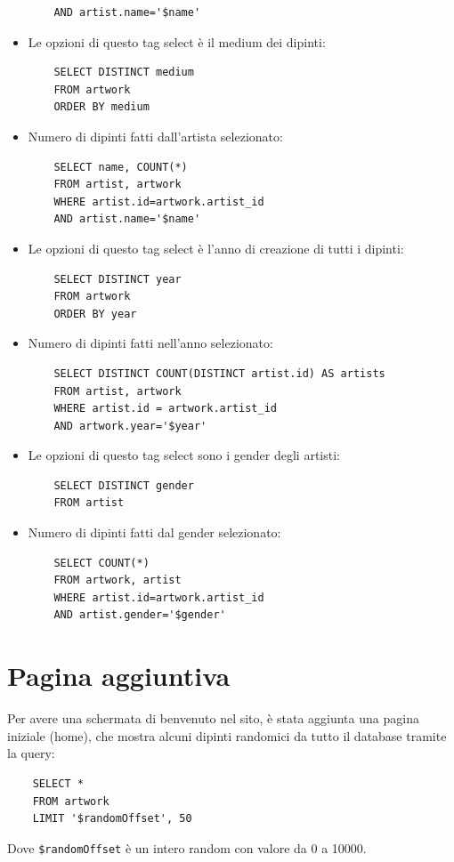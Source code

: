\documentclass{ol-softwaremanual}
\begin{document}
\begin{itemize}
\begin{verbatim}
    AND artist.name='$name'
    \end{verbatim}
    \item Le opzioni di questo tag select è il medium dei dipinti:
    \begin{verbatim}
    SELECT DISTINCT medium 
    FROM artwork
    ORDER BY medium
    \end{verbatim}
    \item Numero di dipinti fatti dall'artista selezionato:
    \begin{verbatim}
    SELECT name, COUNT(*)
    FROM artist, artwork 
    WHERE artist.id=artwork.artist_id
    AND artist.name='$name'
    \end{verbatim}
    \item Le opzioni di questo tag select è l'anno di creazione di tutti i dipinti:
    \begin{verbatim}
    SELECT DISTINCT year
    FROM artwork
    ORDER BY year
    \end{verbatim}
    \item Numero di dipinti fatti nell'anno selezionato:
    \begin{verbatim}
    SELECT DISTINCT COUNT(DISTINCT artist.id) AS artists 
    FROM artist, artwork 
    WHERE artist.id = artwork.artist_id 
    AND artwork.year='$year'
    \end{verbatim}
    \item Le opzioni di questo tag select sono i gender degli artisti:
    \begin{verbatim}
    SELECT DISTINCT gender
    FROM artist
    \end{verbatim}
    \item Numero di dipinti fatti dal gender selezionato:
    \begin{verbatim}
    SELECT COUNT(*)
    FROM artwork, artist
    WHERE artist.id=artwork.artist_id
    AND artist.gender='$gender'
    \end{verbatim}
\end{itemize}

\section{Pagina aggiuntiva}
Per avere una schermata di benvenuto nel sito, è stata aggiunta una pagina iniziale (home), che mostra alcuni dipinti randomici da 
tutto il database tramite la query:
\begin{verbatim}
    SELECT *
    FROM artwork
    LIMIT '$randomOffset', 50
\end{verbatim}
Dove \verb|$randomOffset| è un intero random con valore da 0 a 10000.
\end{document}
